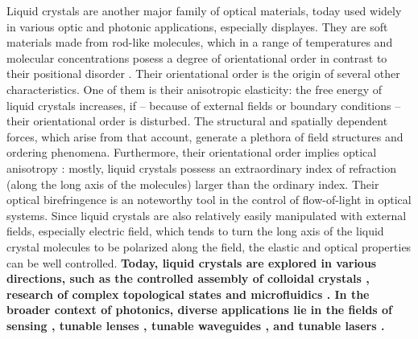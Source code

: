 \documentclass[a4paper,11pt]{article}
\begin{document}

Liquid crystals are another major family of optical materials, today used widely in various optic and photonic applications, especially displayes. 
They are soft materials made from rod-like molecules, which in a range of temperatures and molecular concentrations posess a degree of orientational order in contrast to their positional disorder \cite{degennes}. 
Their orientational order is the origin of several other characteristics. 
One of them is their anisotropic elasticity: the free energy of liquid crystals increases, if -- because of external fields or boundary conditions -- their orientational order is disturbed. 
The structural and spatially dependent forces, which arise from that account, generate a plethora of field structures and ordering phenomena. 
Furthermore, their orientational order implies optical anisotropy \cite{hecht-optics}: mostly, liquid crystals possess an extraordinary index of refraction (along the long axis of the molecules) larger than the ordinary index. 
Their optical birefringence is an noteworthy tool in the control of flow-of-light in optical systems. 
Since liquid crystals are also relatively easily manipulated with external fields, especially electric field, which tends to turn the long axis of the liquid crystal molecules to be polarized along the field, the elastic and optical properties can be well controlled.
{\bfseries Today, liquid crystals are explored in various directions, such as the controlled assembly of colloidal crystals \cite{musevic-2013-colloidal-crystal}, research of complex topological states \cite{smalyukh-2014-knots,zumer-2014-knots} and microfluidics \cite{yeomans-2013-lc-microfluidics}.
In the broader context of photonics, diverse applications lie in the fields of sensing \cite{abbott-2013-sensing}, tunable lenses \cite{lin-2011-lensing}, tunable waveguides \cite{kitzerow-2014-fibres}, and tunable lasers \cite{humar-2016-lasing}. }

% 
% 
% 
% 
% 
% 
% 
% 
% 
% 
% 
% 
% 
\end{document}
